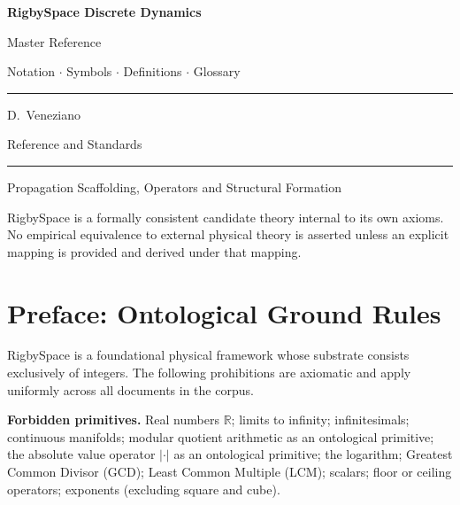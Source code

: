 \documentclass[11pt, letterpaper]{article}
\theoremstyle{definition}
\theoremstyle{plain}
\begin{document}
\begin{titlepage}
  \centering
  \vspace*{2cm}
  {\Huge\bfseries\color{RSblue} RigbySpace Discrete Dynamics\par}
  \vspace{0.5cm}
  {\LARGE Master Reference \par}
  \vspace{0.5cm}
  {\large Notation $\cdot$ Symbols $\cdot$ Definitions $\cdot$ Glossary\par}
  \vspace{2cm}
  \rule{0.6\textwidth}{0.4pt}\par
  \vspace{1cm}
  {\large D.\ Veneziano\par}
  \vspace{0.8cm}
  {\normalsize Reference and Standards\par}
  \vspace{1.5cm}
  \rule{0.6\textwidth}{0.4pt}\par
  \vspace{0.5cm}
  {\small Propagation Scaffolding, Operators and Structural Formation\par}
  \vfill
  {\small\color{RSgray}
  RigbySpace is a formally consistent candidate theory internal to its own
  axioms.  No empirical equivalence to external physical theory is asserted
  unless an explicit mapping is provided and derived under that mapping.\par}
\end{titlepage}

\tableofcontents
\newpage


\section{Preface: Ontological Ground Rules}

RigbySpace is a foundational physical framework whose substrate consists
exclusively of integers.  The following prohibitions are axiomatic and apply
uniformly across all documents in the corpus.

\medskip
\noindent\textbf{Forbidden primitives.}
Real numbers $\mathbb{R}$; limits to infinity; infinitesimals; continuous
manifolds; modular quotient arithmetic as an ontological primitive; the absolute
value operator $|\cdot|$ as an ontological primitive; the logarithm; Greatest Common Divisor (GCD); 
Least Common Multiple (LCM); scalars; floor or ceiling operators; exponents (excluding square and cube).
\end{document}
